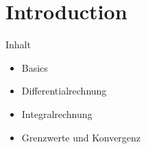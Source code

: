 \section{Introduction}

\begin{definition}{Inhalt}
    \begin{itemize}
        \item Basics
        \item Differentialrechnung
        \item Integralrechnung
        \item Grenzwerte und Konvergenz
    \end{itemize}
\end{definition}
